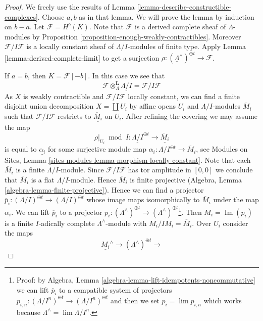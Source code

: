 \documentclass[10pt,a4paper]{amsart}
\theoremstyle{plain}
\theoremstyle{definition}
\theoremstyle{remark}
\numberwithin{equation}{subsection}
\def\lim{\mathop{\mathrm{lim}}\nolimits}
\def\Im{\mathop{\mathrm{Im}}}
\begin{document}
\begin{proof}
We freely use the results of
Lemma \ref{lemma-describe-constructible-complexes}.
Choose $a, b$ as in that lemma. We will prove the lemma by
induction on $b - a$. Let $\mathcal{F} = H^b(K)$.
Note that $\mathcal{F}$ is a derived complete sheaf of
$\Lambda$-modules by
Proposition \ref{proposition-enough-weakly-contractibles}.
Moreover $\mathcal{F}/I\mathcal{F}$ is a locally
constant sheaf of $\Lambda/I$-modules of finite type.
Apply Lemma \ref{lemma-derived-complete-limit} to get a surjection
$\rho : (\underline{\Lambda}^\wedge)^{\oplus t} \to \mathcal{F}$.

\medskip\noindent
If $a = b$, then $K = \mathcal{F}[-b]$. In this case we see that
$$
\mathcal{F} \otimes_\Lambda^\mathbf{L} \underline{\Lambda/I} =
\mathcal{F}/I\mathcal{F}
$$
As $X$ is weakly contractible and $\mathcal{F}/I\mathcal{F}$
locally constant, we can find a finite disjoint
union decomposition $X = \coprod U_i$ by affine opens $U_i$
and $\Lambda/I$-modules $\overline{M}_i$
such that $\mathcal{F}/I\mathcal{F}$ restricts to
$\underline{\overline{M}_i}$ on $U_i$. After refining the covering
we may assume the map
$$
\rho|_{U_i} \bmod I :
\underline{\Lambda/I}^{\oplus t}
\longrightarrow
\underline{\overline{M}_i}
$$
is equal to $\underline{\alpha_i}$ for some surjective module map
$\alpha_i : \Lambda/I^{\oplus t} \to \overline{M}_i$, see
Modules on Sites, Lemma \ref{sites-modules-lemma-morphism-locally-constant}.
Note that each $\overline{M}_i$ is a finite $\Lambda/I$-module.
Since $\mathcal{F}/I\mathcal{F}$ has tor amplitude in $[0, 0]$
we conclude that $\overline{M}_i$ is a flat $\Lambda/I$-module.
Hence $\overline{M}_i$ is finite projective
(Algebra, Lemma \ref{algebra-lemma-finite-projective}).
Hence we can find a projector
$\overline{p}_i : (\Lambda/I)^{\oplus t} \to (\Lambda/I)^{\oplus t}$
whose image maps isomorphically to $\overline{M}_i$ under the map $\alpha_i$.
We can lift $\overline{p}_i$ to a projector
$p_i : (\Lambda^\wedge)^{\oplus t} \to
(\Lambda^\wedge)^{\oplus t}$\footnote{Proof: by
Algebra, Lemma \ref{algebra-lemma-lift-idempotents-noncommutative}
we can lift $\overline{p}_i$ to a compatible system of
projectors $p_{i, n} : (\Lambda/I^n)^{\oplus t} \to (\Lambda/I^n)^{\oplus t}$
and then we set $p_i = \lim p_{i, n}$ which works because
$\Lambda^\wedge = \lim \Lambda/I^n$.}.
Then $M_i = \Im(p_i)$ is a finite $I$-adically complete
$\Lambda^\wedge$-module with $M_i/IM_i = \overline{M}_i$.
Over $U_i$ consider the maps
$$
\underline{M_i}^\wedge \to
(\underline{\Lambda}^\wedge)^{\oplus t} \to
$$
\end{proof}
\end{document}

